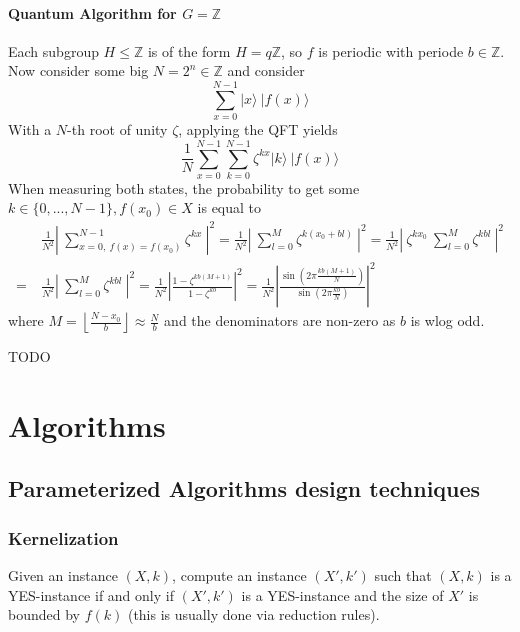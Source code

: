 \documentclass{scrartcl}
\newcommand{\Z}{\mathbb{Z}}
\begin{document}
\paragraph{Quantum Algorithm for $G = \Z$}
Each subgroup $H \leq \Z$ is of the form $H = q\Z$, so $f$ is periodic with periode $b \in \Z$.
Now consider some big $N = 2^n \in \Z$ and consider
\begin{equation*}
    \sum_{x = 0}^{N - 1} |x\rangle \ |f(x)\rangle
\end{equation*}
With a $N$-th root of unity $\zeta$, applying the QFT yields
\begin{equation*}
    \frac 1 N \sum_{x = 0}^{N - 1} \sum_{k = 0}^{N - 1} \zeta^{k x} |k\rangle \ |f(x)\rangle
\end{equation*}
When measuring both states, the probability to get some $k \in \{0, ..., N-1\}, f(x_0) \in X$ is equal to
\begin{align*}
    &\frac 1 {N^2} \left| \ \sum_{x = 0, \ f(x) = f(x_0)}^{N - 1} \zeta^{k x} \ \right|^2 = \frac 1 {N^2} \left| \ \sum_{l = 0}^M \zeta^{k (x_0 + bl)} \ \right|^2 = \frac 1 {N^2} \left| \ \zeta^{kx_0} \ \sum_{l = 0}^M \zeta^{kbl} \ \right|^2 \\
    = \ &\frac 1 {N^2} \left| \ \sum_{l = 0}^M \zeta^{kbl} \ \right|^2 = \frac 1 {N^2} \left| \frac {1 - \zeta^{kb(M + 1)}} {1 - \zeta^{kb}} \right|^2 = \frac 1 {N^2} \left| \frac {\sin(2\pi \frac {kb(M+1)} N)} {\sin(2\pi \frac {kb} N)} \right|^2
\end{align*}
where $M = \left\lfloor \frac {N - x_0} b \right\rfloor \approx \frac N b$ and the denominators are non-zero as $b$ is wlog odd.

TODO

\section{Algorithms}

\subsection{Parameterized Algorithms design techniques}

\subsubsection*{Kernelization}

Given an instance $(X, k)$, compute an instance $(X', k')$ such that $(X, k)$ is a YES-instance if and only if $(X', k')$ is a YES-instance and the size of $X'$ is bounded by $f(k)$ (this is usually done via reduction rules).
\end{document}
